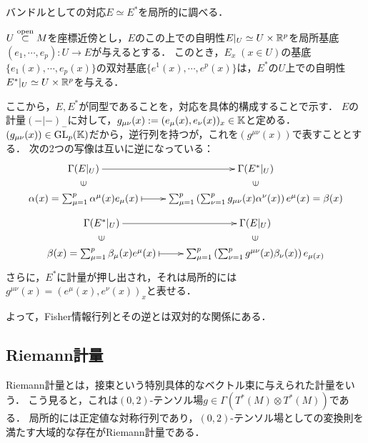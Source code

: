 \documentclass[uplatex,dvipdfmx]{jsreport}
\begin{document}
\begin{discussion}
    バンドルとしての対応$E\simeq E^*$を局所的に調べる．

    $U\overset{\mathrm{open}}{\subset} M$を座標近傍とし，$E$のこの上での自明性$E|_U\simeq U\times\mathbb{R}^p$を局所基底$(e_1,\cdots,e_p):U\to E$が与えるとする．
    このとき，$E_x\;(x\in U)$の基底$\{e_1(x),\cdots,e_p(x)\}$の双対基底$\{e^1(x),\cdots,e^p(x)\}$は，$E^*$の$U$上での自明性$E^*|_U\simeq U\times\mathbb{R}^p$を与える．

    ここから，$E,E^*$が同型であることを，対応を具体的構成することで示す．
    $E$の計量$(-|-)_-$に対して，$g_{\mu\nu}(x):=(e_\mu(x),e_\nu(x))_x\in\mathbb{K}$と定める．
    $(g_{\mu\nu}(x))\in\mathrm{GL}_p(\mathbb{K})$だから，逆行列を持つが，これを$(g^{\mu\nu}(x))$で表すこととする．
    次の2つの写像は互いに逆になっている：
    \[\xymatrix@R-2pc{
        \Gamma(E|_U)\ar[r]&\Gamma(E^*|_U)\\
        \rotatebox[origin=c]{90}{$\in$}&\rotatebox[origin=c]{90}{$\in$}\\
        \al(x)=\sum^p_{\mu=1}\al^\mu(x)e_\mu(x)\ar@{|->}[r]&\sum^p_{\mu=1}\paren{\sum^p_{\nu=1}g_{\mu\nu}(x)\al^\nu(x)}e^\mu(x)=\beta(x)
    }\]
    \[\xymatrix@R-2pc{
        \Gamma(E^*|_U)\ar[r]&\Gamma(E|_U)\\
        \rotatebox[origin=c]{90}{$\in$}&\rotatebox[origin=c]{90}{$\in$}\\
        \beta(x)=\sum^p_{\mu=1}\beta_\mu(x)e^\mu(x)\ar@{|->}[r]&\sum^p_{\mu=1}\paren{\sum^p_{\nu=1}g^{\mu\nu}(x)\beta_\nu(x)}e_{\mu(x)}
    }\]
    さらに，$E^*$に計量が押し出され，それは局所的には$g^{\mu\nu}(x)=(e^\mu(x),e^\nu(x))_x$と表せる．
\end{discussion}
\begin{remarks}
    よって，Fisher情報行列とその逆とは双対的な関係にある．
\end{remarks}

\subsection{Riemann計量}

\begin{tcolorbox}[colframe=ForestGreen, colback=ForestGreen!10!white,breakable,colbacktitle=ForestGreen!40!white,coltitle=black,fonttitle=\bfseries\sffamily,
title=]
    Riemann計量とは，接束という特別具体的なベクトル束に与えられた計量をいう．
    こう見ると，これは$(0,2)$-テンソル場$g\in\Gamma(T^*(M)\otimes T^*(M))$である．
    局所的には正定値な対称行列であり，$(0,2)$-テンソル場としての変換則を満たす大域的な存在がRiemann計量である．
\end{tcolorbox}
\end{document}
